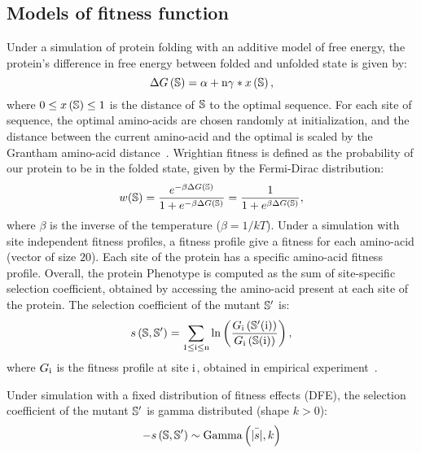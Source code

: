\subsection{Models of fitness function}
\label{MatMet:folding}

Under a simulation of protein folding with an additive model of free energy, the protein's difference in free energy between folded and unfolded state is given by:
\begin{equation*}
    \Delta G\left(\mathbb{S}\right) = \alpha + \text{n} \gamma * x\left(\mathbb{S}\right),
\end{equation*}
where $0 \leq x\left(\mathbb{S}\right) \leq 1$ is the distance of $\mathbb{S}$ to the optimal sequence.
For each site of sequence, the optimal amino-acids are chosen randomly at initialization, and the distance between the current amino-acid and the optimal is scaled by the Grantham amino-acid distance~\citep{Grantham1974}.
Wrightian fitness is defined as the probability of our protein to be in the folded state, given by the Fermi-Dirac distribution:
\begin{equation}
    w (\mathbb{S}) = \dfrac{e^{-\beta \Delta G\left(\mathbb{S}\right) }}{1 + e^{-\beta \Delta G\left(\mathbb{S}\right) }} = \dfrac{1}{1 + e^{\beta \Delta G\left(\mathbb{S}\right) }},
\end{equation}
where $\beta$ is the inverse of the temperature ($\beta=1/kT$).
Under a simulation with site independent fitness profiles, a fitness profile give a fitness for each amino-acid (vector of size $20$).
Each site of the protein has a specific amino-acid fitness profile.
Overall, the protein \gls{Phenotype} is computed as the sum of site-specific selection coefficient, obtained by accessing the amino-acid present at each site of the protein.
The selection coefficient of the mutant $\mathbb{S}'$ is:
\begin{equation}
    s \left( \mathbb{S},\mathbb{S}'\right) = \sum\limits_{1 \leq \text{i} \leq \text{n}} \ln \left( \dfrac{G_{\text{i}} \left(\mathbb{S}'(\text{i}) \right)}{G_{\text{i}} \left(\mathbb{S}(\text{i}) \right)} \right) ,
\end{equation}
where $G_{\text{i}}$ is the fitness profile at site $\text{i}$, obtained in empirical experiment~\citep{Bloom2017}.

Under simulation with a fixed distribution of fitness effects (\acrshort{DFE}), the selection coefficient of the mutant $\mathbb{S}'$ is gamma distributed (shape $k > 0$):
\begin{equation}
    - s \left( \mathbb{S},\mathbb{S}'\right) \sim \text{Gamma} \left( \bar{|s|}, k \right)
\end{equation}

